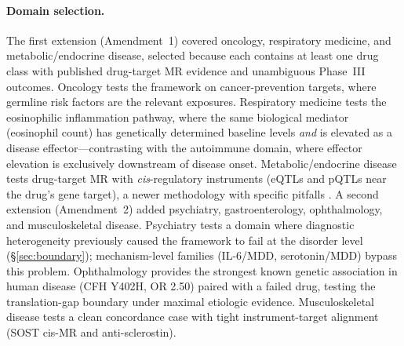 \documentclass[11pt]{article}
\begin{document}
\paragraph{Domain selection.} The first extension (Amendment~1) covered oncology, respiratory medicine, and metabolic/endocrine disease, selected because each contains at least one drug class with published drug-target MR evidence and unambiguous Phase~III outcomes. Oncology tests the framework on cancer-prevention targets, where germline risk factors are the relevant exposures. Respiratory medicine tests the eosinophilic inflammation pathway, where the same biological mediator (eosinophil count) has genetically determined baseline levels \emph{and} is elevated as a disease effector---contrasting with the autoimmune domain, where effector elevation is exclusively downstream of disease onset. Metabolic/endocrine disease tests drug-target MR with \emph{cis}-regulatory instruments (eQTLs and pQTLs near the drug's gene target), a newer methodology with specific pitfalls \cite{gill2024pitfalls}. A second extension (Amendment~2) added psychiatry, gastroenterology, ophthalmology, and musculoskeletal disease. Psychiatry tests a domain where diagnostic heterogeneity previously caused the framework to fail at the disorder level (\S\ref{sec:boundary}); mechanism-level families (IL-6/MDD, serotonin/MDD) bypass this problem. Ophthalmology provides the strongest known genetic association in human disease (CFH Y402H, OR 2.50) paired with a failed drug, testing the translation-gap boundary under maximal etiologic evidence. Musculoskeletal disease tests a clean concordance case with tight instrument-target alignment (SOST cis-MR and anti-sclerostin).
\end{document}
